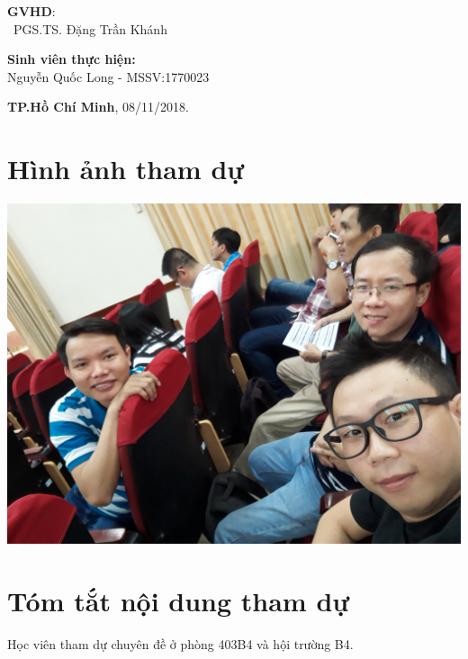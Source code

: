 \documentclass{hcmutarticle}
\begin{document}
\vspace{2cm}

\begin{minipage}[t]{0.60\linewidth}
\textbf{GVHD}: \\
\ PGS.TS. Đặng Trần Khánh
\end{minipage}
\begin{minipage}[t]{0.40\linewidth}
\textbf{Sinh viên thực hiện:}\\
Nguyễn Quốc Long - MSSV:1770023
\end{minipage}

\vspace{4cm}

\begin{center}

\textbf{TP.Hồ Chí Minh},
08/11/2018.

\end{center}



\newpage

\tableofcontents 

\newpage

\section{Hình ảnh tham dự}
\begin{center}
	\includegraphics[scale=0.2]{image/hoinghi1.jpg}\\[1cm]
\end{center}
\section{Tóm tắt nội dung tham dự}\label{survey}
Học viên tham dự chuyên đề ở phòng 403B4 và hội trường B4.
\end{document}
